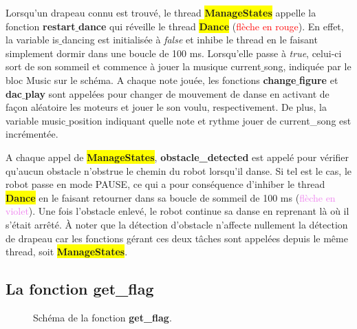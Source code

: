 \documentclass{article}
\newcommand{\state}{\colorbox{yellow}{\textbf{ManageStates}}\xspace}
\newcommand{\dance}{\colorbox{yellow}{\textbf{Dance}}\xspace}
\begin{document}
    Lorsqu'un drapeau connu est trouvé, le thread \state appelle la fonction \textbf{restart$\_$dance} qui réveille le thread \colorbox{yellow}{\textbf{Dance}} (\textcolor{red}{flèche en rouge}). 
    En effet, la variable \textcolor{bleu}{is$\_$dancing} est initialisée à \textit{false} et inhibe le thread en le faisant simplement dormir dans une boucle de 100 ms. 
    Lorsqu'elle passe à \textit{true}, celui-ci sort de son sommeil et commence à jouer la musique \textcolor{bleu}{current$\_$song}, indiquée par le bloc \textcolor{bleu}{Music} sur le schéma. 
    A chaque note jouée, les fonctions \textbf{change$\_$figure} et \textbf{dac$\_$play} sont appelées pour changer de mouvement de danse en activant de façon aléatoire les moteurs et jouer le son voulu, respectivement. 
    De plus, la variable \textcolor{bleu}{music$\_$position} indiquant quelle note et rythme jouer de \textcolor{bleu}{current\_song} est incrémentée.  \\ \par
    
    A chaque appel de \state, \textbf{obstacle\_detected} est appelé pour vérifier qu'aucun obstacle n'obstrue le chemin du robot lorsqu'il danse. 
    Si tel est le cas, le robot passe en mode \textcolor{bleu}{PAUSE}, ce qui a pour conséquence d'inhiber le thread \dance en le faisant retourner dans sa boucle de sommeil de 100 ms (\textcolor{violet}{flèche en violet}). 
    Une fois l'obstacle enlevé, le robot continue sa danse en reprenant là où il s'était arrêté. 
    À noter que la détection d'obstacle n'affecte nullement la détection de drapeau car les fonctions gérant ces deux tâches sont appelées depuis le même thread, soit \state.

    \subsection{La fonction get\_flag}
    \label{get_flag}
    
    \begin{figure}[!ht]
        \noindent{}
        \caption{Schéma de la fonction \textbf{get\_flag}.}
        \label{fig:get_flag} %
    \end{figure}
    
\end{document}
